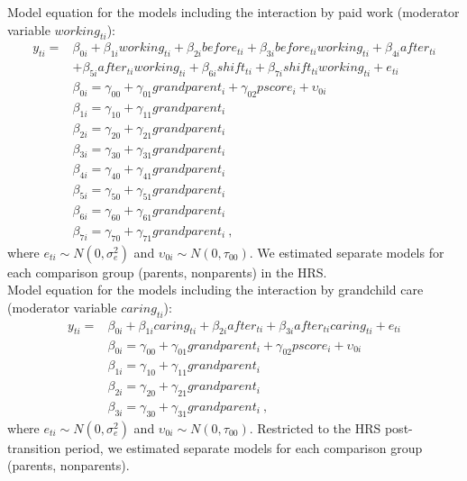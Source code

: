 \documentclass[
  english,
  man,floatsintext]{apa7}
\begin{document}
Model equation for the models including the interaction by paid work (moderator variable \(working_{ti}\)):
\begin{equation}
\begin{split}
y_{ti} =& \beta_{0i} + \beta_{1i}working_{ti} + \beta_{2i}before_{ti} + \beta_{3i}before_{ti}working_{ti} + \beta_{4i}after_{ti} \\
 & + \beta_{5i}after_{ti}working_{ti} + \beta_{6i}shift_{ti} + \beta_{7i}shift_{ti}working_{ti} + e_{ti} \\
 & \beta_{0i} = \gamma_{00} + \gamma_{01}grandparent_i + \gamma_{02}pscore_i + \upsilon_{0i} \\
 & \beta_{1i} = \gamma_{10} + \gamma_{11}grandparent_i \\
 & \beta_{2i} = \gamma_{20} + \gamma_{21}grandparent_i \\
 & \beta_{3i} = \gamma_{30} + \gamma_{31}grandparent_i \\
 & \beta_{4i} = \gamma_{40} + \gamma_{41}grandparent_i \\
 & \beta_{5i} = \gamma_{50} + \gamma_{51}grandparent_i \\
 & \beta_{6i} = \gamma_{60} + \gamma_{61}grandparent_i \\
 & \beta_{7i} = \gamma_{70} + \gamma_{71}grandparent_i\ ,
\end{split}
  \label{eq:mlm3}
\end{equation}
where \(e_{ti} \sim N(0, \sigma_e^2)\) and \(\upsilon_{0i} \sim N(0, \tau_{00})\). We estimated separate models for each comparison group (parents, nonparents) in the HRS.\\
Model equation for the models including the interaction by grandchild care (moderator variable \(caring_{ti}\)):
\begin{equation}
\begin{split}
y_{ti} =& \beta_{0i} + \beta_{1i}caring_{ti} + \beta_{2i}after_{ti} + \beta_{3i}after_{ti}caring_{ti} + e_{ti} \\
 & \beta_{0i} = \gamma_{00} + \gamma_{01}grandparent_i + \gamma_{02}pscore_i + \upsilon_{0i} \\
 & \beta_{1i} = \gamma_{10} + \gamma_{11}grandparent_i \\
 & \beta_{2i} = \gamma_{20} + \gamma_{21}grandparent_i \\
 & \beta_{3i} = \gamma_{30} + \gamma_{31}grandparent_i\ ,
\end{split}
  \label{eq:mlm4}
\end{equation}
where \(e_{ti} \sim N(0, \sigma_e^2)\) and \(\upsilon_{0i} \sim N(0, \tau_{00})\). Restricted to the HRS post-transition period, we estimated separate models for each comparison group (parents, nonparents).
\end{document}
